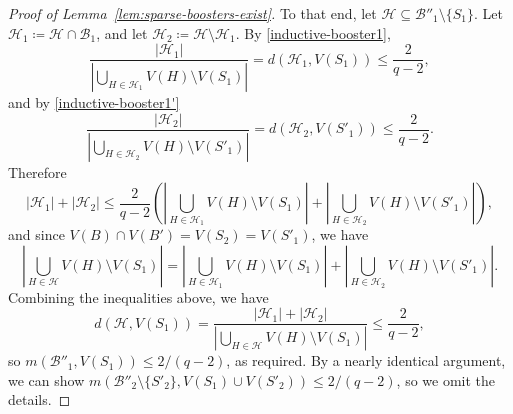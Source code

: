 \documentclass[11pt]{article}
\numberwithin{equation}{section}
\newcounter{i}
\theoremstyle{plain}
\theoremstyle{plain} %
\theoremstyle{definition}
\newcommand{\cB}{\mathcal{B}}
\newcommand{\cH}{\mathcal{H}}
\def\COMMENT#1{}
\begin{document}
\begin{proof}[Proof of Lemma~\ref{lem:sparse-boosters-exist}]
    To that end, let $\cH \subseteq \cB''_1\setminus\{S_1\}$. Let $\cH_1 \coloneqq \cH \cap \cB_1$, and let $\cH_2 \coloneqq \cH\setminus \cH_1$.  By \ref{inductive-booster1},
    \begin{equation*}
        \frac{|\cH_1|}{|\bigcup_{H \in \cH_1}V(H)\setminus V(S_1)|} = d(\cH_1, V(S_1)) \leq \frac{2}{q-2},
    \end{equation*}
    and by \ref{inductive-booster1'}
    \begin{equation*}
        \frac{|\cH_2|}{|\bigcup_{H \in \cH_2}V(H)\setminus V(S'_1)|} = d(\cH_2, V(S'_1)) \leq \frac{2}{q-2}.
    \end{equation*}
    Therefore
    \begin{equation*}
        |\cH_1| + |\cH_2| \leq \frac{2}{q - 2}\left(\left|\bigcup_{H \in \cH_1}V(H)\setminus V(S_1)\right| + \left|\bigcup_{H \in \cH_2}V(H)\setminus V(S'_1)\right|\right),
    \end{equation*}
    and since $V(B) \cap V(B') = V(S_2) = V(S'_1)$, we have
    \begin{equation*}
        \left|\bigcup_{H \in \cH}V(H)\setminus V(S_1)\right| = \left|\bigcup_{H \in \cH_1}V(H)\setminus V(S_1)\right| + \left|\bigcup_{H \in \cH_2}V(H)\setminus V(S'_1)\right|.
    \end{equation*}
    Combining the inequalities above, we have
    \begin{equation*}
        d(\cH, V(S_1)) = \frac{|\cH_1| + |\cH_2|}{|\bigcup_{H \in \cH}V(H)\setminus V(S_1)|} \leq \frac{2}{q-2},
    \end{equation*}
    so $m(\cB''_1, V(S_1)) \leq 2 / (q - 2)$, as required.
    By a nearly identical argument, we can show $m(\cB''_2 \setminus \{S'_2\}, V(S_1) \cup V(S'_2)) \leq 2 / (q - 2)$, so we omit the details.\COMMENT{
    To that end, let $\cH \subseteq \cB''_2\setminus\{S'_2\}$. Let $\cH_1 \coloneqq \cH \cap \cB_2$, and let $\cH_2 \coloneqq \cH\setminus \cH_1$.  By \ref{inductive-booster2},
    \begin{equation*}
        \frac{|\cH_1|}{|\bigcup_{H \in \cH_1}V(H)\setminus (V(S_1) \cup V(S_2)|} = d(\cH_1, V(S_1) \cup V(S_2)) \leq \frac{2}{q-2},
    \end{equation*}
    and by \ref{inductive-booster2'}
    \begin{equation*}
        \frac{|\cH_2|}{|\bigcup_{H \in \cH_2}V(H)\setminus (V(S'_1) \cup V(S'_2)|} = d(\cH_2, V(S'_1)) \leq \frac{2}{q-2}.
    \end{equation*}
    Therefore
    \begin{equation*}

\end{equation*}}
\end{proof}
\end{document}
